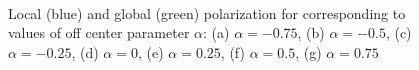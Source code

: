 \documentclass[../../master_thesis_np.tex]{subfiles}
\begin{document}
		\begin{figure}[htp]\ContinuedFloat
			\centering
			\\
			
			\caption{Local (blue) and global (green) polarization for corresponding to values of off center parameter $\alpha$: (a) $\alpha = -0.75$, (b) $\alpha = -0.5$, (c) $\alpha = -0.25$, (d) $\alpha = 0$, (e) $\alpha = 0.25$, (f) $\alpha = 0.5$, (g) $\alpha = 0.75$}
			\label{fig:lj_oc_pol}
		\end{figure}
		
\end{document}
